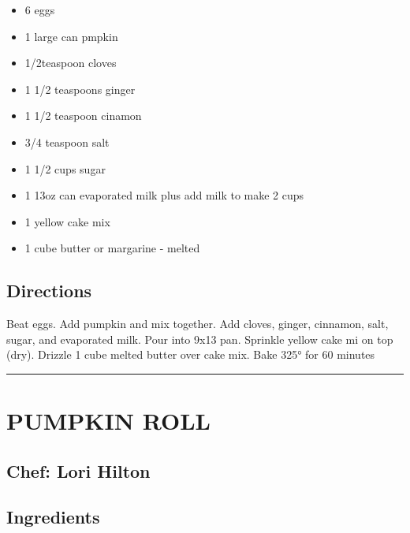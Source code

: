 \documentclass[
]{book}
\providecommand{\tightlist}{%
  \setlength{\itemsep}{0pt}\setlength{\parskip}{0pt}}
\begin{document}
\begin{itemize}
\tightlist
\item
  6 eggs
\item
  1 large can pmpkin
\item
  1/2teaspoon cloves
\item
  1 1/2 teaspoons ginger
\item
  1 1/2 teaspoon cinamon
\item
  3/4 teaspoon salt
\item
  1 1/2 cups sugar
\item
  1 13oz can evaporated milk plus add milk to make 2 cups
\item
  1 yellow cake mix
\item
  1 cube butter or margarine - melted
\end{itemize}

\hypertarget{directions-87}{%
\subsection*{Directions}\label{directions-87}}


Beat eggs. Add pumpkin and mix together. Add cloves, ginger, cinnamon, salt, sugar, and evaporated milk. Pour into 9x13 pan. Sprinkle yellow cake mi on top (dry). Drizzle 1 cube melted butter over cake mix. Bake 325° for 60 minutes

\begin{center}\rule{0.5\linewidth}{0.5pt}\end{center}

\hypertarget{pumpkin-roll}{%
\section*{PUMPKIN ROLL}\label{pumpkin-roll}}


\hypertarget{chef-lori-hilton-5}{%
\subsection*{Chef: Lori Hilton}\label{chef-lori-hilton-5}}


\hypertarget{ingredients-88}{%
\subsection*{Ingredients}\label{ingredients-88}}
\end{document}
